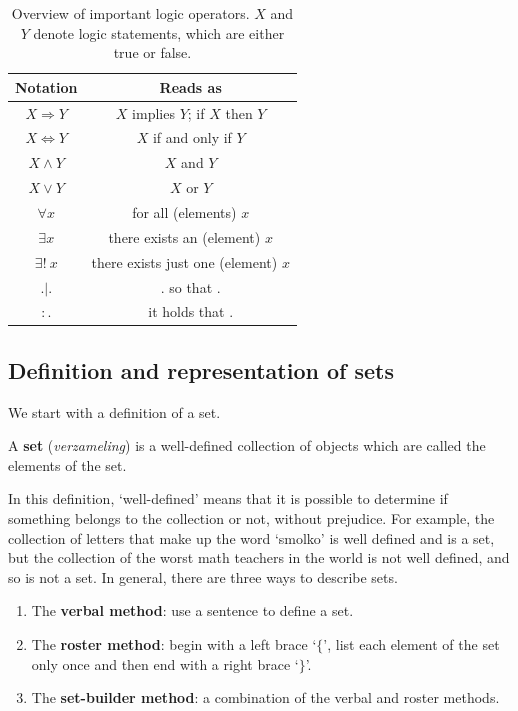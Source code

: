 \begin{table}[]
	\centering
	\renewcommand{\arraystretch}{2}%
	\begin{tabular}{c||c}
		Notation               & Reads as \\\hline
		$X \Rightarrow Y$     & $X$ implies $Y$;  if $X$ then $Y$\\\hline
		$X \Leftrightarrow Y$  & $X$ if and only if $Y$\\\hline
		$X \wedge Y$           & $X$ and $Y$ \\\hline
		$X \vee Y$             & $X$ or $Y$ \\\hline
		$\forall x$   & for all (elements) $x$ \\\hline
		$\exists x$   & there exists an (element) $x$ \\\hline
		$\exists !\  x$   & there exists just one (element) $x$ \\\hline
		$.|.$   & . so that . \\\hline
		$:.$   & it holds that . \\
	\end{tabular}
	\caption{Overview of important logic operators. $X $ and $Y$ denote logic statements, which are either true or false.}
	\label{tab:logicsymbols}
\end{table}


\pagebreak
\subsection{Definition and representation of sets}
We start with a definition of a set. 
\begin{definition}[Set]
A \textbf{set} (\textit{verzameling}) is a well-defined collection of objects which are called the elements of the set.  
\end{definition}
In this definition, `well-defined' means that it is possible to determine if something belongs to the collection or not, without prejudice. For example, the collection of letters that make up the word `smolko' is well defined and is a set, but  the collection of the worst math teachers in the world is not well defined, and so is not a set.  In general, there are three ways to describe sets. 

\begin{enumerate}
	\item The \textbf{verbal method}: use a sentence to define a set.
	\item The \textbf{roster method}:  begin with a left brace `$\{$', list each element of the set only once and then end with a right brace `$\}$'.
	\item The \textbf{set-builder method}: a combination of the verbal and roster methods.
\end{enumerate}

